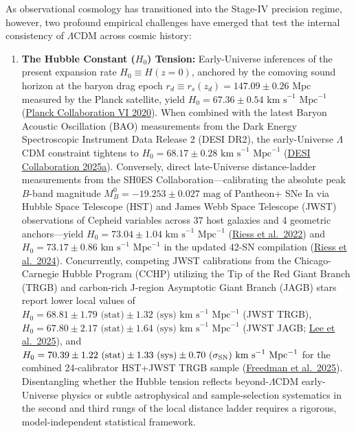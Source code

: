 \documentclass[aps,prd,preprint,superscriptaddress,nofootinbib]{revtex4-2}
\begin{document}
As observational cosmology has transitioned into the Stage-IV precision regime, however, two profound empirical challenges have emerged that test the internal consistency of $\Lambda$CDM across cosmic history:

\begin{enumerate}
    \setlength{\itemsep}{3pt}
    \item \textbf{The Hubble Constant ($H_0$) Tension:} Early-Universe inferences of the present expansion rate $H_0 \equiv H(z=0)$, anchored by the comoving sound horizon at the baryon drag epoch $r_d \equiv r_s(z_d) = 147.09 \pm 0.26\text{ Mpc}$ measured by the Planck satellite, yield $H_0 = 67.36 \pm 0.54\text{ km s}^{-1}\text{ Mpc}^{-1}$ (\href{https://arxiv.org/abs/1807.06209}{Planck Collaboration VI 2020}). When combined with the latest Baryon Acoustic Oscillation (BAO) measurements from the Dark Energy Spectroscopic Instrument Data Release 2 (DESI DR2), the early-Universe $\Lambda$CDM constraint tightens to $H_0 = 68.17 \pm 0.28\text{ km s}^{-1}\text{ Mpc}^{-1}$ (\href{https://arxiv.org/abs/2503.14738}{DESI Collaboration 2025a}). Conversely, direct late-Universe distance-ladder measurements from the SH0ES Collaboration---calibrating the absolute peak $B$-band magnitude $M_B^0 = -19.253 \pm 0.027\text{ mag}$ of Pantheon+ SNe Ia via Hubble Space Telescope (HST) and James Webb Space Telescope (JWST) observations of Cepheid variables across 37 host galaxies and 4 geometric anchors---yield $H_0 = 73.04 \pm 1.04\text{ km s}^{-1}\text{ Mpc}^{-1}$ (\href{https://arxiv.org/pdf/2112.04510}{Riess et al.\ 2022}) and $H_0 = 73.17 \pm 0.86\text{ km s}^{-1}\text{ Mpc}^{-1}$ in the updated 42-SN compilation (\href{https://arxiv.org/abs/2408.11770}{Riess et al.\ 2024}). Concurrently, competing JWST calibrations from the Chicago-Carnegie Hubble Program (CCHP) utilizing the Tip of the Red Giant Branch (TRGB) and carbon-rich J-region Asymptotic Giant Branch (JAGB) stars report lower local values of $H_0 = 68.81 \pm 1.79\text{ (stat)} \pm 1.32\text{ (sys)}\text{ km s}^{-1}\text{ Mpc}^{-1}$ (JWST TRGB), $H_0 = 67.80 \pm 2.17\text{ (stat)} \pm 1.64\text{ (sys)}\text{ km s}^{-1}\text{ Mpc}^{-1}$ (JWST JAGB; \href{https://arxiv.org/abs/2408.03474}{Lee et al.\ 2025}), and $H_0 = 70.39 \pm 1.22\text{ (stat)} \pm 1.33\text{ (sys)} \pm 0.70\text{ ($\sigma_{\rm SN}$)}\text{ km s}^{-1}\text{ Mpc}^{-1}$ for the combined 24-calibrator HST+JWST TRGB sample (\href{https://arxiv.org/abs/2408.06153}{Freedman et al.\ 2025}). Disentangling whether the Hubble tension reflects beyond-$\Lambda$CDM early-Universe physics or subtle astrophysical and sample-selection systematics in the second and third rungs of the local distance ladder requires a rigorous, model-independent statistical framework.

\end{enumerate}
\end{document}
